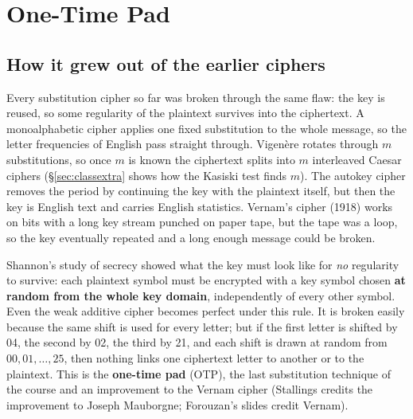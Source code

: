 \providecommand{\railfence}[1]{%
  \foreach \l/\r [count=\i] in {#1}{\node[font=\small] (rf\i) at (\i*0.5,-\r*0.6) {\l};}}

\section{One-Time Pad \hot}\label{sec:otp}

\subsection{How it grew out of the earlier ciphers}
Every substitution cipher so far was broken through the same flaw: the key is reused, so some regularity of the plaintext survives into the ciphertext. A monoalphabetic cipher applies one fixed substitution to the whole message, so the letter frequencies of English pass straight through. Vigen\`ere rotates through $m$ substitutions, so once $m$ is known the ciphertext splits into $m$ interleaved Caesar ciphers (\S\ref{sec:classextra} shows how the Kasiski test finds $m$). The autokey cipher removes the period by continuing the key with the plaintext itself, but then the key is English text and carries English statistics. Vernam's cipher (1918) works on bits with a long key stream punched on paper tape, but the tape was a loop, so the key eventually repeated and a long enough message could be broken.

Shannon's study of secrecy showed what the key must look like for \emph{no} regularity to survive: each plaintext symbol must be encrypted with a key symbol chosen \textbf{at random from the whole key domain}, independently of every other symbol. Even the weak additive cipher becomes perfect under this rule. It is broken easily because the same shift is used for every letter; but if the first letter is shifted by 04, the second by 02, the third by 21, and each shift is drawn at random from $00, 01, \dots, 25$, then nothing links one ciphertext letter to another or to the plaintext. This is the \textbf{one-time pad} (OTP), the last substitution technique of the course and an improvement to the Vernam cipher (Stallings credits the improvement to Joseph Mauborgne; Forouzan's slides credit Vernam).


